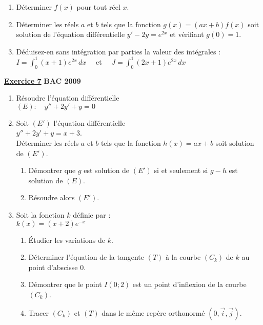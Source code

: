 \documentclass[12pt,a4paper]{article}
\newcommand{\exo}[1]{%
        \textbf{\underline{Exercice #1}}
}
\begin{document}
\begin{multicols}{2}
\begin{enumerate}
    \item Déterminer \( f(x) \) pour tout réel \( x \).
    
    \item Déterminer les réels \( a \) et \( b \) tels que la fonction \( g(x) = (ax + b)f(x) \) soit solution de l’équation différentielle \( y' - 2y = e^{2x} \) et vérifiant \( g(0) = 1 \).
    
    \item Déduisez-en sans intégration par parties la valeur des intégrales :  
    \( I = \int_{0}^{1} (x + 1)e^{2x} \, dx \quad \) et \( \quad J = \int_{0}^{1} (2x + 1)e^{2x} \, dx \)
\end{enumerate}

\vspace{0.5cm}

\exo{7} \textbf{BAC 2009}

\begin{enumerate}
    \item Résoudre l’équation différentielle\\ \( (E) :\quad y'' + 2y' + y = 0 \)
    
    \item Soit \( (E') \) l’équation différentielle\\ \( y'' + 2y' + y = x + 3 \).\\
    Déterminer les réels \( a \) et \( b \) tels que la fonction \( h(x) = ax + b \) soit solution de \( (E') \).
    \begin{enumerate}
        \item Démontrer que \( g \) est solution de \( (E') \) si et seulement si \( g - h \) est solution de \( (E) \).
        \item Résoudre alors \( (E') \).
    \end{enumerate}
    
    \item Soit la fonction \( k \) définie par :\\ \( k(x) = (x + 2)e^{-x} \)
    \begin{enumerate}
        \item Étudier les variations de \( k \).
        \item Déterminer l’équation de la tangente \( (T) \) à la courbe \( (C_k) \) de \( k \) au point d’abscisse 0.
        \item Démontrer que le point \( I(0;2) \) est un point d’inflexion de la courbe \( (C_k) \).
        \item Tracer \( (C_k) \) et \( (T) \) dans le même repère orthonormé \( (0,\vec{i},\vec{j}) \).
    \end{enumerate}
\end{enumerate}


\end{multicols}
\end{document}
